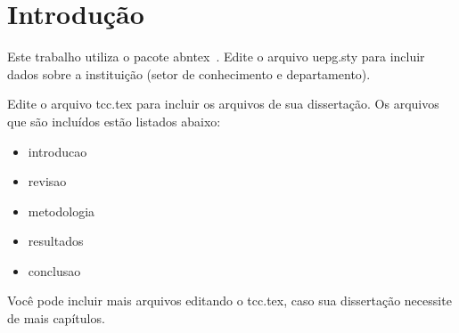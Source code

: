 \chapter{Introdução}
Este trabalho utiliza o pacote abntex~\cite{abntex2classe}. 
Edite o arquivo uepg.sty para incluir dados sobre a instituição (setor de conhecimento e departamento).

Edite o arquivo tcc.tex para incluir os arquivos de sua dissertação. Os arquivos que são incluídos estão listados abaixo:

\begin{itemize}	
	\item introducao
	\item revisao
 	\item metodologia
	\item resultados
	\item conclusao
\end{itemize}

Você pode incluir mais arquivos editando o tcc.tex, caso sua dissertação necessite de mais capítulos.

